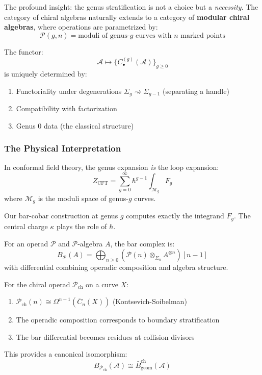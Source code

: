 The profound insight: the genus stratification is not a choice but a \emph{necessity}.
The category of chiral algebras naturally extends to a category of \textbf{modular
chiral algebras}, where operations are parametrized by:
$$\mathcal{P}(g,n) = \text{moduli of genus-}g\text{ curves with }n\text{ marked points}$$

The functor:
$$\mathcal{A} \mapsto \{ C_{\bullet}^{(g)}(\mathcal{A}) \}_{g \geq 0}$$
is uniquely determined by:
\begin{enumerate}
\item Functoriality under degenerations $\Sigma_g \rightsquigarrow \Sigma_{g-1}$
(separating a handle)
\item Compatibility with factorization
\item Genus 0 data (the classical structure)
\end{enumerate}

\subsubsection{The Physical Interpretation}

In conformal field theory, the genus expansion \emph{is} the loop expansion:
$$Z_{\text{CFT}} = \sum_{g=0}^{\infty} \hbar^{g-1} \int_{\mathcal{M}_g} F_g$$
where $\mathcal{M}_g$ is the moduli space of genus-$g$ curves.

Our bar-cobar construction at genus $g$ computes exactly the integrand $F_g$.
The central charge $\kappa$ plays the role of $\hbar$.

\begin{theorem}\label{thm:operadic-bar}
For an operad $\mathcal{P}$ and $\mathcal{P}$-algebra $A$, the bar complex is:
$$B_{\mathcal{P}}(A) = \bigoplus_{n \geq 0} (\mathcal{P}(n) \otimes_{\Sigma_n} A^{\otimes n})[n-1]$$
with differential combining operadic composition and algebra structure.
\end{theorem}

\begin{theorem}\label{thm:geometric-bridge}
For the chiral operad $\mathcal{P}_{\text{ch}}$ on a curve $X$:
\begin{enumerate}
\item $\mathcal{P}_{\text{ch}}(n) \cong \Omega^{n-1}(\overline{C}_n(X))$ (Kontsevich-Soibelman)
\item The operadic composition corresponds to boundary stratification
\item The bar differential becomes residues at collision divisors
\end{enumerate}

This provides a canonical isomorphism:
$$B_{\mathcal{P}_{\text{ch}}}(\mathcal{A}) \cong \bar{B}^{\text{ch}}_{\text{geom}}(\mathcal{A})$$
\end{theorem}

